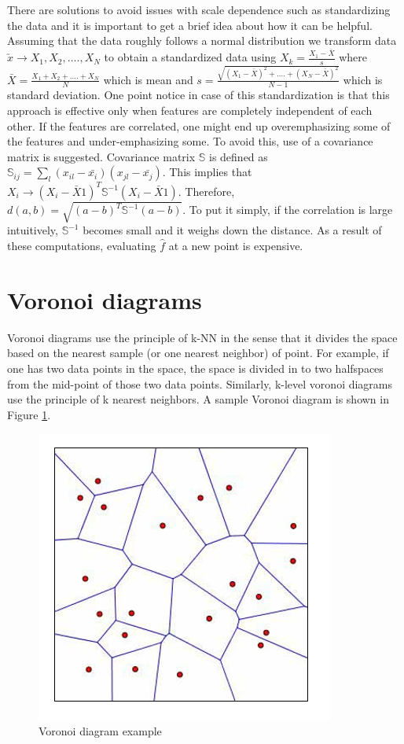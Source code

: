 \documentclass{article}
\begin{document}
There are solutions to avoid issues with scale dependence such as standardizing the data and it is important to get a brief idea about how it can be helpful. Assuming that the data roughly follows a normal distribution we transform data $\utilde{x} \rightarrow X_1, X_2,\dots{.},X_N$ to obtain a standardized data using $X_k = \frac{X_1 - \bar{X}}{s}$ where $\bar{X} = \frac{X_1 + X_2 + \dots{.} + X_N}{N}$ which is mean and $s = \frac{\sqrt{(X_1 - \bar{X})^2 + \dots{.} + (X_N - \bar{X})^2}}{N-1}$ which is standard deviation. One point notice in case of this standardization is that this approach is effective only when features are completely independent of each other. If the features are correlated, one might end up overemphasizing some of the features and under-emphasizing some. To avoid this, use of a covariance matrix is suggested. Covariance matrix $\mathbb{S}$ is defined as $\mathbb{S}_{ij} = \sum_l(x_{il} - \bar{x_i})(x_{jl} - \bar{x_j})$. This implies that $X_i \rightarrow (X_i - \bar{X}1)^T\mathbb{S}^{-1} (X_i - \bar{X}1)$. Therefore, $d(a, b) = \sqrt{(a - b)^T \mathbb{S}^{-1}(a - b)}$. To put it simply, if the correlation is large intuitively, $\mathbb{S}^{-1}$ becomes small and it weighs down the distance. As a result of these computations, evaluating $\hat{f}$ at a new point is expensive.

\section{Voronoi diagrams}
Voronoi diagrams use the principle of k-NN in the sense that it divides the space based on the nearest sample (or one nearest neighbor) of point. For example, if one has two data points in the space, the space is divided in to two halfspaces from the mid-point of those two data points. Similarly, k-level voronoi diagrams use the principle of k nearest neighbors. A sample Voronoi diagram is shown in Figure \ref{Fig.2}.
\begin{figure}
\begin{center}
\includegraphics[scale=0.5]{voronoiExample.PNG}
\caption{Voronoi diagram example}
\label{Fig.2}
\end{center}
\end{figure}
\end{document}
